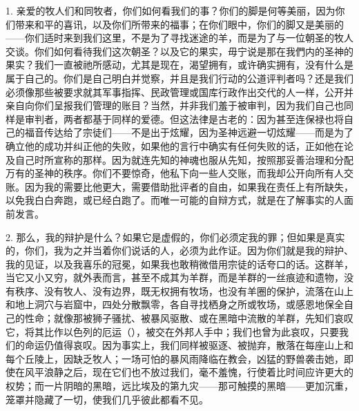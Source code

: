 1. 亲爱的牧人们和同牧者，你们如何看我们的事？你们的脚是何等美丽，因为你们带来和平的喜讯，以及你们所带来的福事；在你们眼中，你们的脚又是美丽的——你们适时来到我们这里，不是为了寻找迷途的羊，而是为了与一位朝圣的牧人交谈。你们如何看待我们这次朝圣？以及它的果实，毋宁说是那在我們内的圣神的果实？我们一直被祂所感动，尤其是现在，渴望拥有，或许确实拥有，没有什么是属于自己的。你们是自己明白并觉察，并且是我们行动的公道评判者吗？还是我们必须像那些被要求就其军事指挥、民政管理或国库行政作出交代的人一样，公开并亲自向你们呈报我们管理的账目？当然，并非我们羞于被审判，因为我们自己也同样是审判者，两者都基于同样的爱德。但这法律是古老的：因为甚至连保禄也将自己的福音传达给了宗徒们——不是出于炫耀，因为圣神远避一切炫耀——而是为了确立他的成功并纠正他的失败，如果他的言行中确实有任何失败的话，正如他在论及自己时所宣称的那样。因为就连先知的神魂也服从先知，按照那妥善治理和分配万有的圣神的秩序。你们不要惊奇，他私下向一些人交账，而我却公开向所有人交账。因为我的需要比他更大，需要借助批评者的自由，如果我在责任上有所缺失，以免我白白奔跑，或已经白跑了。而唯一可能的自辩方式，就是在了解事实的人面前发言。\par

2. 那么，我的辩护是什么？如果它是虚假的，你们必须定我的罪；但如果是真实的，你们，我为之并当着你们说话的人，必须为此作证。因为你们就是我的辩护、我的见证，以及我喜乐的冠冕，如果我也敢稍微借用宗徒的话夸口的话。这群羊，当它又小又穷，就外表而言，甚至不成其为羊群，而是羊群的一丝痕迹和遗物，没有秩序、没有牧人、没有边界，既无权拥有牧场，也没有羊圈的保护，流落在山上和地上洞穴与岩窟中，四处分散飘零，各自寻找栖身之所或牧场，或感恩地保全自己的性命；就像那被狮子骚扰、被暴风驱散、或在黑暗中流散的羊群，先知们哀叹它，将其比作以色列的厄运（），被交在外邦人手中；我们也曾为此哀叹，只要我们的命运仍值得哀叹。因为事实上，我们同样被驱逐、被抛弃，散落在每座山上和每个丘陵上，因缺乏牧人；一场可怕的暴风雨降临在教会，凶猛的野兽袭击她，即使在风平浪静之后，现在它们也不放过我们，毫不羞愧，行使着比时间应许更大的权势；而一片阴暗的黑暗，远比埃及的第九灾——那可触摸的黑暗——更加沉重，笼罩并隐藏了一切，使我们几乎彼此都看不见。\par

